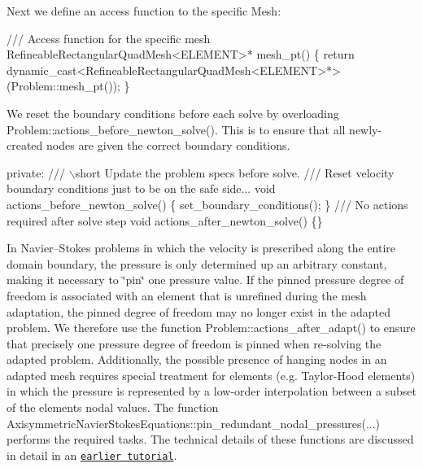 Next we define an access function to the specific {\ttfamily Mesh\+:} 


\begin{DoxyCodeInclude}
 \textcolor{comment}{/// Access function for the specific mesh}
 RefineableRectangularQuadMesh<ELEMENT>* mesh\_pt() 
  \{
   \textcolor{keywordflow}{return} \textcolor{keyword}{dynamic\_cast<}RefineableRectangularQuadMesh<ELEMENT>*\textcolor{keyword}{>}
    (Problem::mesh\_pt());
  \}

\end{DoxyCodeInclude}


We reset the boundary conditions before each solve by overloading {\ttfamily Problem\+::actions\+\_\+before\+\_\+newton\+\_\+solve()}. This is to ensure that all newly-\/created nodes are given the correct boundary conditions.


\begin{DoxyCodeInclude}
\textcolor{keyword}{private}:
\textcolor{comment}{}
\textcolor{comment}{ /// \(\backslash\)short Update the problem specs before solve. }
\textcolor{comment}{ /// Reset velocity boundary conditions just to be on the safe side...}
\textcolor{comment}{} \textcolor{keywordtype}{void} actions\_before\_newton\_solve() \{ set\_boundary\_conditions(); \}
 \textcolor{comment}{}
\textcolor{comment}{ /// No actions required after solve step}
\textcolor{comment}{} \textcolor{keywordtype}{void} actions\_after\_newton\_solve() \{\}

\end{DoxyCodeInclude}


In Navier--Stokes problems in which the velocity is prescribed along the entire domain boundary, the pressure is only determined up an arbitrary constant, making it necessary to \char`\"{}pin\char`\"{} one pressure value. If the pinned pressure degree of freedom is associated with an element that is unrefined during the mesh adaptation, the pinned degree of freedom may no longer exist in the adapted problem. We therefore use the function {\ttfamily Problem\+::actions\+\_\+after\+\_\+adapt()} to ensure that precisely one pressure degree of freedom is pinned when re-\/solving the adapted problem. Additionally, the possible presence of hanging nodes in an adapted mesh requires special treatment for elements (e.\+g. Taylor-\/\+Hood elements) in which the pressure is represented by a low-\/order interpolation between a subset of the element\textquotesingle{}s nodal values. The function {\ttfamily Axisymmetric\+Navier\+Stokes\+Equations\+::pin\+\_\+redundant\+\_\+nodal\+\_\+pressures}(...) performs the required tasks. The technical details of these functions are discussed in detail in an \href{../../../navier_stokes/adaptive_driven_cavity/html/index.html}{\tt earlier tutorial}.


